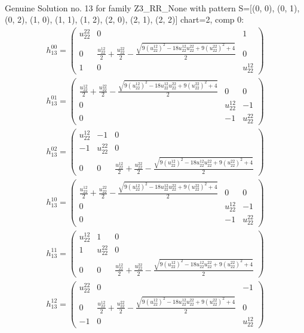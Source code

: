 \documentclass[a4paper, 11pt, twoside, onecolumn]{article}
\begin{document}
\begin{landscape}
\begin{gather*}
\end{gather*} 
Genuine Solution no. 13 for family Z3_RR_None with pattern S=[(0, 0), (0, 1), (0, 2), (1, 0), (1, 1), (1, 2), (2, 0), (2, 1), (2, 2)] chart=2, comp 0: 
\begin{gather*} 
	 h_13^{00}=\begin{pmatrix}u^{22}_{22} & 0 & 1\\0 & \frac{u^{12}_{22}}{2} + \frac{u^{22}_{22}}{2} - \frac{\sqrt{9 \left(u^{12}_{22}\right)^{2} - 18 u^{12}_{22} u^{22}_{22} + 9 \left(u^{22}_{22}\right)^{2} + 4}}{2} & 0\\1 & 0 & u^{12}_{22}\end{pmatrix}\\ 
	 h_13^{01}=\begin{pmatrix}\frac{u^{12}_{22}}{2} + \frac{u^{22}_{22}}{2} - \frac{\sqrt{9 \left(u^{12}_{22}\right)^{2} - 18 u^{12}_{22} u^{22}_{22} + 9 \left(u^{22}_{22}\right)^{2} + 4}}{2} & 0 & 0\\0 & u^{12}_{22} & -1\\0 & -1 & u^{22}_{22}\end{pmatrix}\\ 
	 h_13^{02}=\begin{pmatrix}u^{12}_{22} & -1 & 0\\-1 & u^{22}_{22} & 0\\0 & 0 & \frac{u^{12}_{22}}{2} + \frac{u^{22}_{22}}{2} - \frac{\sqrt{9 \left(u^{12}_{22}\right)^{2} - 18 u^{12}_{22} u^{22}_{22} + 9 \left(u^{22}_{22}\right)^{2} + 4}}{2}\end{pmatrix}\\ 
	 h_13^{10}=\begin{pmatrix}\frac{u^{12}_{22}}{2} + \frac{u^{22}_{22}}{2} - \frac{\sqrt{9 \left(u^{12}_{22}\right)^{2} - 18 u^{12}_{22} u^{22}_{22} + 9 \left(u^{22}_{22}\right)^{2} + 4}}{2} & 0 & 0\\0 & u^{12}_{22} & -1\\0 & -1 & u^{22}_{22}\end{pmatrix}\\ 
	 h_13^{11}=\begin{pmatrix}u^{12}_{22} & 1 & 0\\1 & u^{22}_{22} & 0\\0 & 0 & \frac{u^{12}_{22}}{2} + \frac{u^{22}_{22}}{2} - \frac{\sqrt{9 \left(u^{12}_{22}\right)^{2} - 18 u^{12}_{22} u^{22}_{22} + 9 \left(u^{22}_{22}\right)^{2} + 4}}{2}\end{pmatrix}\\ 
	 h_13^{12}=\begin{pmatrix}u^{22}_{22} & 0 & -1\\0 & \frac{u^{12}_{22}}{2} + \frac{u^{22}_{22}}{2} - \frac{\sqrt{9 \left(u^{12}_{22}\right)^{2} - 18 u^{12}_{22} u^{22}_{22} + 9 \left(u^{22}_{22}\right)^{2} + 4}}{2} & 0\\-1 & 0 & u^{12}_{22}\end{pmatrix}\\ 

\end{gather*}
\end{landscape}
\end{document}
